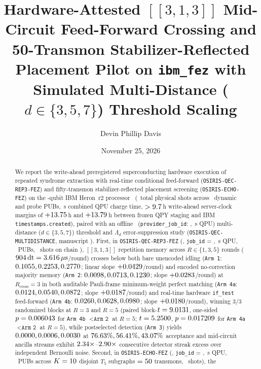 \documentclass[aps,prx,twocolumn,superscriptaddress,nofootinbib]{revtex4-2}
\begin{document}
\title{Hardware-Attested $[[3,1,3]]$ Mid-Circuit Feed-Forward Crossing and 50-Transmon Stabilizer-Reflected Placement Pilot on \texttt{ibm\_fez} with Simulated Multi-Distance ($d \in \{3, 5, 7\}$) Threshold Scaling}

\author{Devin Phillip Davis}
\date{November 25, 2026}

\begin{abstract}
We report the write-ahead preregistered superconducting hardware execution of repeated syndrome extraction with real-time conditional feed-forward (\texttt{OSIRIS-QEC-REP3-FEZ}) and fifty-transmon stabilizer-reflected placement screening (\texttt{OSIRIS-ECHO-FEZ}) on the \remHeronQubits-qubit IBM Heron~r2 processor \remBackend\ (\remTotalPhysicalShots\ total physical shots across \remTotalPhysicalPubs\ dynamic and probe PUBs, \remTotalQpuSec\,s combined QPU charge time, $>9.7$\,h write-ahead server-clock margins of $+13.75$\,h and $+13.79$\,h between frozen QPY staging and IBM \texttt{timestamps.created}), paired with an offline \remSimTier\ (\texttt{provider\_job\_id}: \remSimJobId, \remSimQpuSec\,s QPU) multi-distance ($d \in \{3, 5, 7\}$) threshold and $\Lambda_d$ error-suppression study (\texttt{OSIRIS-QEC-MULTIDISTANCE}, manuscript \remPaperId). First, in \texttt{OSIRIS-QEC-REP3-FEZ} (\remHwTier, \texttt{job\_id} = \remRepJobId, \remRepQpuSec\,s QPU, \remRepTotalPubs\ PUBs, \remRepTotalShots\ shots on chain \remRepChain), $[[3,1,3]]$ repetition memory across $R \in \{1, 3, 5\}$ rounds ($904\,\mathrm{dt} = 3.616\,\mu\mathrm{s}$/round) crosses below both bare unencoded idling (\texttt{Arm 1}: $0.1055, 0.2253, 0.2770$; linear slope $+0.0429$/round) and encoded no-correction majority memory (\texttt{Arm 2}: $0.0098, 0.0713, 0.1230$; slope $+0.0283$/round) at $R_{\mathrm{cross}} = 3$ in both auditable Pauli-frame minimum-weight perfect matching (\texttt{Arm 4a}: $0.0124, 0.0540, 0.0872$; slope $+0.0187$/round) and real-time hardware \texttt{if\_test} feed-forward (\texttt{Arm 4b}: $0.0260, 0.0628, 0.0980$; slope $+0.0180$/round), winning $3/3$ randomized blocks at $R = 3$ and $R = 5$ (paired block-$t = 9.0131$, one-sided $p = 0.006043$ for \texttt{Arm 4b} $< \texttt{Arm 2}$ at $R = 5$; $t = 5.2500$, $p = 0.017209$ for \texttt{Arm 4a} $< \texttt{Arm 2}$ at $R = 5$), while postselected detection (\texttt{Arm 3}) yields $0.0000, 0.0006, 0.0030$ at $76.63\%, 56.41\%, 43.07\%$ acceptance and mid-circuit ancilla streams exhibit $2.34\times$--$2.90\times$ consecutive detector streak excess over independent Bernoulli noise. Second, in \texttt{OSIRIS-ECHO-FEZ} (\remHwTier, \texttt{job\_id} = \remEchoJobId, \remEchoQpuSec\,s QPU, \remEchoTotalPubs\ PUBs across $K = 10$ disjoint $T_5$ subgraphs $= 50$ transmons, \remEchoTotalShots\ shots), the 
\end{abstract}
\end{document}
